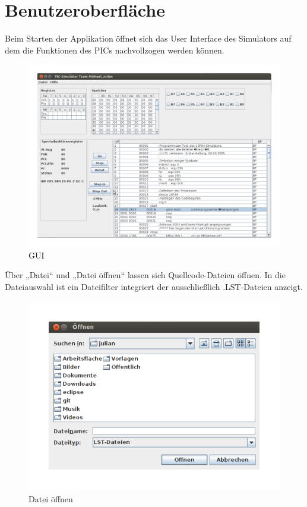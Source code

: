 \section{Benutzeroberfläche}

Beim Starten der Applikation öffnet sich das User Interface des Simulators auf dem die Funktionen des PICs nachvollzogen werden können.

\begin{figure}[h]
\centering
\includegraphics[scale=0.4]{Bilder/GUI.pdf}
\caption{GUI}
\end{figure}
\newpage

\noindent Über „Datei“ und „Datei öffnen“ lassen sich Quellcode-Dateien öffnen. In die Dateiauswahl ist ein Dateifilter integriert der ausschließlich .LST-Dateien anzeigt.

\begin{figure}[h]
\centering
\includegraphics[scale=0.7]{Bilder/Offnen.pdf}
\caption{Datei öffnen}
\end{figure}

